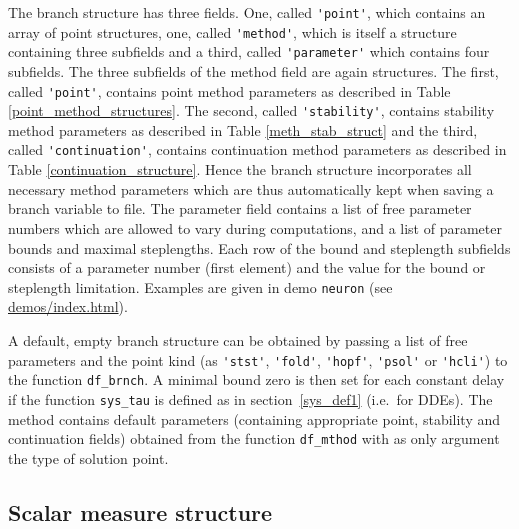\documentclass[10pt]{scrartcl}
\newcommand{\demobase}{\url{demos/index.html}}
\newcommand{\blist}[1]{\mbox{\lstinline!#1!}}
\begin{document}
The branch structure has three fields. One, called \blist{'point'},
which contains an array of point structures, one, called
\blist{'method'}, which is itself a structure containing three
subfields and a third, called \blist{'parameter'} which contains four
subfields.  The three subfields of the method field are again
structures. The first, called \blist{'point'}, contains point method
parameters as described in Table \ref{point_method_structures}.  The
second, called \blist{'stability'}, contains stability method
parameters as described in Table \ref{meth_stab_struct} and the third,
called \blist{'continuation'}, contains continuation method parameters
as described in Table \ref{continuation_structure}.  Hence the branch
structure incorporates all necessary method parameters which are thus
automatically kept when saving a branch variable to file.  The
parameter field contains a list of free parameter numbers which are
allowed to vary during computations, and a list of parameter bounds
and maximal steplengths. Each row of the bound and steplength
subfields consists of a parameter number (first element) and the value
for the bound or steplength limitation. Examples are given in demo
\texttt{neuron} (see \demobase{}).

A default, empty branch structure can be obtained by passing
a list of free parameters and the point kind 
(as \blist{'stst'}, \blist{'fold'}, \blist{'hopf'}, \blist{'psol'}
or \blist{'hcli'})
to the function \blist{df_brnch}. A minimal bound zero is then set
for each constant delay if the function \blist{sys_tau} is defined
as in section~\ref{sys_def1} (i.e.~for DDEs). The method contains 
default parameters
(containing appropriate point, stability and continuation fields)
obtained from the function \blist{df_mthod} with as only argument the type
of solution point.


\subsection{Scalar measure structure}\label{sec:meas:struct}
\end{document}
